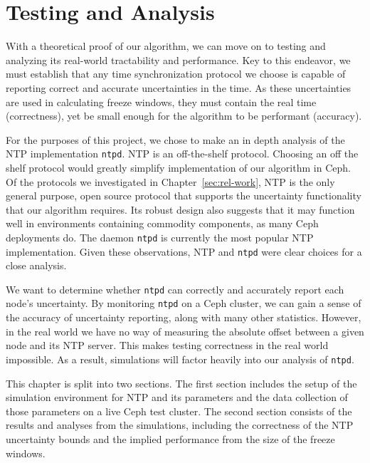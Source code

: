 \chapter{Testing and Analysis}
\label{sec:results}

With a theoretical proof of our algorithm, we can move on to
testing and analyzing its real-world tractability and performance. 
Key to this endeavor, we must establish that any time synchronization
protocol we choose is capable of reporting correct and accurate uncertainties
in the time. As these uncertainties are used in calculating freeze windows,
they must contain the real time (correctness), yet be small enough for the algorithm to 
be performant (accuracy). 

For the purposes of this project, we chose to make an in depth analysis of 
the NTP implementation \texttt{ntpd}. NTP is an off-the-shelf protocol. Choosing
an off the shelf protocol would greatly simplify implementation of our 
algorithm in Ceph. Of the protocols we investigated in Chapter~\ref{sec:rel-work}, 
NTP is the only general purpose, open source protocol that supports the 
uncertainty functionality that our algorithm requires. Its robust design
also suggests that it may function well in environments containing commodity 
components, as many Ceph deployments do. The daemon \texttt{ntpd} 
is currently the most popular NTP implementation. Given these observations, 
NTP and \texttt{ntpd} were clear choices for a close analysis.

We want to determine whether \texttt{ntpd} can 
correctly and accurately report each node's uncertainty. By monitoring 
\texttt{ntpd} on a Ceph cluster, we can gain a sense of the accuracy of
uncertainty reporting, along with many other statistics. However,
in the real world we have no way of measuring the absolute offset between
a given node and its NTP server. This makes testing correctness in the 
real world impossible. As a result, simulations will factor heavily into 
our analysis of \texttt{ntpd}.

This chapter is split into two sections. The first section includes
the setup of the simulation environment for NTP and its parameters
and the data collection of those parameters on a live Ceph test cluster.
The second section consists of the results and analyses from the simulations,
including the correctness of the NTP uncertainty bounds and the implied
performance from the size of the freeze windows. 





